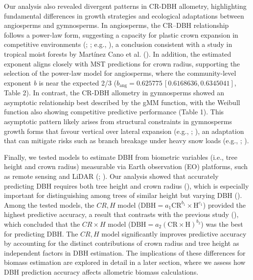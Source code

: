 \documentclass[
  12pt,
  letterpaper,
  DIV=11,
  numbers=noendperiod]{scrartcl}
\begin{document}
Our analysis also revealed divergent patterns in CR-DBH allometry,
highlighting fundamental differences in growth strategies and ecological
adaptations between angiosperms and gymnosperms. In angiosperms, the
CR--DBH relationship follows a power-law form, suggesting a capacity for
plastic crown expansion in competitive environments
(;
; e.g.,
), a conclusion
consistent with a study in tropical moist forests by Martínez Cano et
al. (). In addition, the estimated
exponent aligns closely with MST predictions for crown radius,
supporting the selection of the power-law model for angiosperms, where
the community-level exponent \emph{b} is near the expected 2/3
(\(b_{\text{ang}} = 0.625775 \,
\left[ 0.6168636, 0.6345041 \right]\), Table 2). In contrast, the CR-DBH
allometry in gymnosperms showed an asymptotic relationship best
described by the gMM function, with the Weibull function also showing
competitive predictive performance (Table 1). This asymptotic pattern
likely arises from structural constraints in gymnosperms growth forms
that favour vertical over lateral expansion (e.g.,
;
), an adaptation that can
mitigate risks such as branch breakage under heavy snow loads (e.g.,
; ).

Finally, we tested models to estimate DBH from biometric variables
(i.e., tree height and crown radius) measurable via Earth observation
(EO) platforms, such as remote sensing and LiDAR
(;
). Our analysis showed that
accurately predicting DBH requires both tree height and crown radius
(), which is especially
important for distinguishing among trees of similar height but varying
DBH (). Among the tested models, the
\(CR,H\) model
(\(\mathrm{DBH} = a_1 \mathrm{CR}^{b_1} \times \mathrm{H}^{c_1}\))
provided the highest predictive accuracy, a result that contrasts with
the previous study (),
which concluded that the \(CR \times H\) model
(\(\mathrm{DBH} = a_2(\mathrm{CR} \times \mathrm{H})^{b_2}\)) was the
best for predicting DBH. The \(CR,H\) model significantly improves
predictive accuracy by accounting for the distinct contributions of
crown radius and tree height as independent factors in DBH estimation.
The implications of these differences for biomass estimation are
explored in detail in a later section, where we assess how DBH
prediction accuracy affects allometric biomass calculations.
\end{document}
